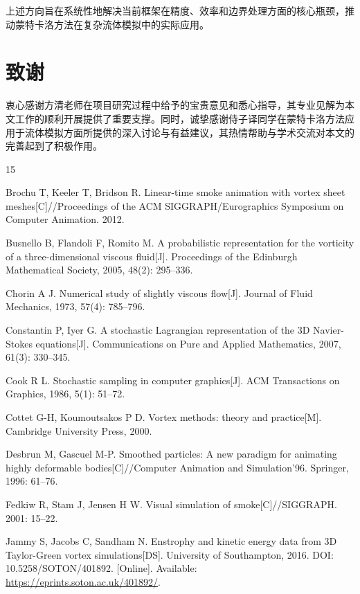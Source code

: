\documentclass[UTF8,fontset=fandol]{ctexart}
\begin{document}
上述方向旨在系统性地解决当前框架在精度、效率和边界处理方面的核心瓶颈，推动蒙特卡洛方法在复杂流体模拟中的实际应用。

\section{致谢}

衷心感谢方清老师在项目研究过程中给予的宝贵意见和悉心指导，其专业见解为本文工作的顺利开展提供了重要支撑。同时，诚挚感谢侍子译同学在蒙特卡洛方法应用于流体模拟方面所提供的深入讨论与有益建议，其热情帮助与学术交流对本文的完善起到了积极作用。

\begin{thebibliography}{15}

 Brochu T, Keeler T, Bridson R. Linear-time smoke animation with vortex sheet meshes[C]//Proceedings of the ACM SIGGRAPH/Eurographics Symposium on Computer Animation. 2012.

 Busnello B, Flandoli F, Romito M. A probabilistic representation for the vorticity of a three-dimensional viscous fluid[J]. Proceedings of the Edinburgh Mathematical Society, 2005, 48(2): 295--336.

 Chorin A J. Numerical study of slightly viscous flow[J]. Journal of Fluid Mechanics, 1973, 57(4): 785--796.

 Constantin P, Iyer G. A stochastic Lagrangian representation of the 3D Navier-Stokes equations[J]. Communications on Pure and Applied Mathematics, 2007, 61(3): 330--345.

 Cook R L. Stochastic sampling in computer graphics[J]. ACM Transactions on Graphics, 1986, 5(1): 51--72.

 Cottet G-H, Koumoutsakos P D. Vortex methods: theory and practice[M]. Cambridge University Press, 2000.

 Desbrun M, Gascuel M-P. Smoothed particles: A new paradigm for animating highly deformable bodies[C]//Computer Animation and Simulation'96. Springer, 1996: 61--76.

 Fedkiw R, Stam J, Jensen H W. Visual simulation of smoke[C]//SIGGRAPH. 2001: 15--22.

 Jammy S, Jacobs C, Sandham N. Enstrophy and kinetic energy data from 3D Taylor-Green vortex simulations[DS]. University of Southampton, 2016. DOI: 10.5258/SOTON/401892. [Online]. Available: \url{https://eprints.soton.ac.uk/401892/}.


\end{thebibliography}
\end{document}
